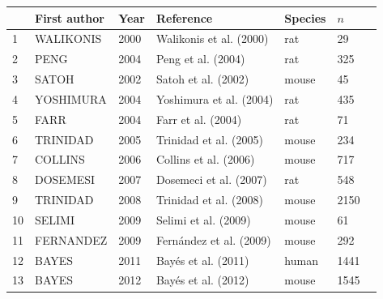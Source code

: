 

\begin{table}[]
    \centering
     \setlength{\extrarowheight}{2pt}
    \begin{tabular}{lllllll}
    \toprule
     & First author & Year & Reference & Species & $n$ \\
    \midrule
1 &    WALIKONIS &2000 &Walikonis et al. (2000)\cite{walikonis2000identification}   & rat & 29 \\
2 &PENG&2004&Peng et al. (2004) \cite{peng2004semiquantitative} & rat& 325\\
3 &SATOH&2002&Satoh et al. (2002)\cite{satoh2002identification}  &mouse &45\\
4 &YOSHIMURA&2004&Yoshimura et al. (2004)\cite{yoshimura2004molecular}  & rat &435\\
5 &FARR&2004&Farr et al. (2004)\cite{farr2004proteomic}  &rat &71 \\
6&TRINIDAD&2005 &Trinidad et al. (2005) \cite{trinidad2005phosphorylation} &mouse& 234\\
7&COLLINS&2006&Collins et al. (2006)\cite{collins2006molecular}  &mouse& 717\\
8&DOSEMESI&2007&Dosemeci et al. (2007)\cite{dosemeci2007composition} & rat& 548\\
9&TRINIDAD&2008&Trinidad et al. (2008) \cite{trinidad2008quantitative} & mouse& 2150\\
10&SELIMI&2009&Selimi et al. (2009)\cite{selimi2009proteomic}   &mouse &61\\
11&FERNANDEZ&2009&Fernández et al. (2009) & mouse &292\\
12&BAYES&2011&Bayés et al. (2011)\cite{bayes2011characterization}  &human &1441\\
13&BAYES&2012&Bayés et al. (2012)\cite{bayes2012comparative}    &mouse &1545\\

\end{tabular}
\end{table}
